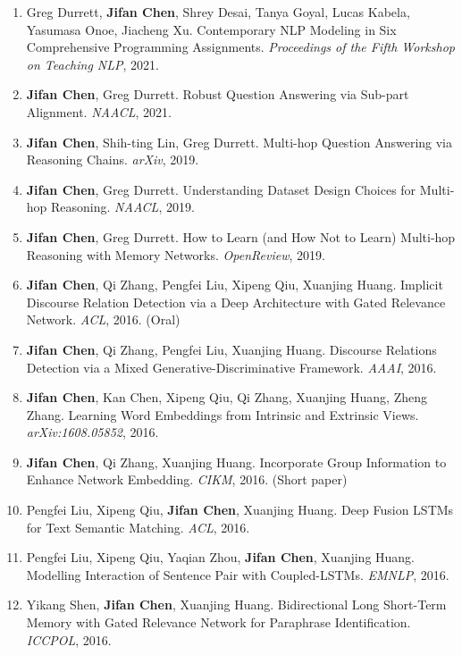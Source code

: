 \documentclass[11pt,letterpaper]{article}
\newcommand{\pub}[1]{\item #1}
\begin{document}
{\begin{enumerate}[leftmargin=1.6em,topsep=2pt,itemsep=4pt,parsep=0pt]
{       Predictions? \emph{Findings of EMNLP}, 2021.}
  \pub{Greg Durrett, \textbf{Jifan Chen}, Shrey Desai, Tanya Goyal, Lucas Kabela, Yasumasa Onoe,
       Jiacheng Xu. Contemporary NLP Modeling in Six Comprehensive Programming Assignments.
       \emph{Proceedings of the Fifth Workshop on Teaching NLP}, 2021.}
  \pub{\textbf{Jifan Chen}, Greg Durrett. Robust Question Answering via Sub-part Alignment.
       \emph{NAACL}, 2021.}
  \pub{\textbf{Jifan Chen}, Shih-ting Lin, Greg Durrett. Multi-hop Question Answering via
       Reasoning Chains. \emph{arXiv}, 2019.}
  \pub{\textbf{Jifan Chen}, Greg Durrett. Understanding Dataset Design Choices for Multi-hop
       Reasoning. \emph{NAACL}, 2019.}
  \pub{\textbf{Jifan Chen}, Greg Durrett. How to Learn (and How Not to Learn) Multi-hop
       Reasoning with Memory Networks. \emph{OpenReview}, 2019.}
  \pub{\textbf{Jifan Chen}, Qi Zhang, Pengfei Liu, Xipeng Qiu, Xuanjing Huang. Implicit Discourse
       Relation Detection via a Deep Architecture with Gated Relevance Network.
       \emph{ACL}, 2016. (Oral)}
  \pub{\textbf{Jifan Chen}, Qi Zhang, Pengfei Liu, Xuanjing Huang. Discourse Relations Detection
       via a Mixed Generative-Discriminative Framework. \emph{AAAI}, 2016.}
  \pub{\textbf{Jifan Chen}, Kan Chen, Xipeng Qiu, Qi Zhang, Xuanjing Huang, Zheng Zhang. Learning
       Word Embeddings from Intrinsic and Extrinsic Views. \emph{arXiv:1608.05852}, 2016.}
  \pub{\textbf{Jifan Chen}, Qi Zhang, Xuanjing Huang. Incorporate Group Information to Enhance
       Network Embedding. \emph{CIKM}, 2016. (Short paper)}
  \pub{Pengfei Liu, Xipeng Qiu, \textbf{Jifan Chen}, Xuanjing Huang. Deep Fusion LSTMs for Text
       Semantic Matching. \emph{ACL}, 2016.}
  \pub{Pengfei Liu, Xipeng Qiu, Yaqian Zhou, \textbf{Jifan Chen}, Xuanjing Huang. Modelling
       Interaction of Sentence Pair with Coupled-LSTMs. \emph{EMNLP}, 2016.}
  \pub{Yikang Shen, \textbf{Jifan Chen}, Xuanjing Huang. Bidirectional Long Short-Term Memory
       with Gated Relevance Network for Paraphrase Identification. \emph{ICCPOL}, 2016.}
\end{enumerate}
}

\end{document}
